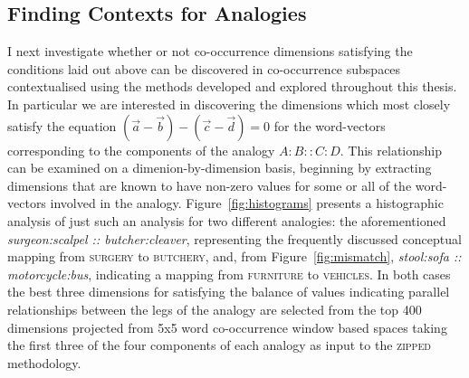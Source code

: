 \subsection{Finding Contexts for Analogies}
I next investigate whether or not co-occurrence dimensions satisfying the conditions laid out above can be discovered in co-occurrence subspaces contextualised using the methods developed and explored throughout this thesis.  In particular we are interested in discovering the dimensions which most closely satisfy the equation $(\overrightarrow{a} - \overrightarrow{b}) - (\overrightarrow{c} - \overrightarrow{d}) = 0$ for the word-vectors corresponding to the components of the analogy $A:B::C:D$.  This relationship can be examined on a dimenion-by-dimension basis, beginning by extracting dimensions that are known to have non-zero values for some or all of the word-vectors involved in the analogy.  Figure~\ref{fig:histograms} presents a histographic analysis of just such an analysis for two different analogies: the aforementioned \emph{surgeon:scalpel :: butcher:cleaver}, representing the frequently discussed conceptual mapping from \textsc{surgery} to \textsc{butchery}, and, from Figure~\ref{fig:mismatch}, \emph{stool:sofa :: motorcycle:bus}, indicating a mapping from \textsc{furniture} to \textsc{vehicles}.  In both cases the best three dimensions for satisfying the balance of values indicating parallel relationships between the legs of the analogy are selected from the top 400 dimensions projected from 5x5 word co-occurrence window based spaces taking the first three of the four components of each analogy as input to the \textsc{zipped} methodology.

